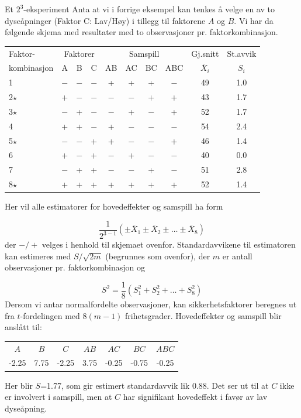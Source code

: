 \begin{eksempel}{Et $2^3$-eksperiment}
Anta at vi i forrige eksempel kan tenkes å velge en av to 
dyseåpninger (Faktor C: Lav/Høy) i tillegg til faktorene $A$ og $B$.
Vi har da følgende skjema med resultater med to observasjoner pr.
faktorkombinasjon.
\begin{center} \addtolength{\tabcolsep}{-0.1\tabcolsep} 
\begin{tabular}{|l|ccc|ccc|c|cc|} \hline
Faktor-     & \multicolumn{3}{c|}{Faktorer}& \multicolumn{4}{c|}{Samspill} &
                                              Gj.snitt &  St.avvik   \\
kombinasjon &  A & B & C  &  AB & AC & BC &  ABC &$\bar{X}_i$& $S_i$\\ \hline
  1         & $-$&$-$&$-$ &  +  & +  & +  &  $-$ &    49     &  1.0    \\  
  2$\star$  &  + &$-$&$-$ & $-$ &$-$ & +  &   +  &    43     &  1.7  \\
  3$\star$  & $-$& + &$-$ & $-$ & +  &$-$ &   +  &    52     &  1.7  \\
  4         &  + & + &$-$ &  +  &$-$ &$-$ &  $-$ &    54     &  2.4 \\
  5$\star$  & $-$&$-$& +  &  +  &$-$ &$-$ &   +  &    46     &  1.4 \\
  6         &  + &$-$& +  & $-$ & +  &$-$ &  $-$ &    40     &  0.0  \\
  7         & $-$& + & +  & $-$ &$-$ & +  &  $-$ &    51     &  2.8 \\
  8$\star$  &  + & + & +  &  +  & +  & +  &   +  &    52     &  1.4 \\ \hline
\end{tabular}
\end{center}
Her vil alle estimatorer for hovedeffekter og samspill ha form

\[ \frac{1}{2^{3-1}}(\pm \bar{X}_1\pm \bar{X}_2\pm \ldots \pm \bar{X}_8) \]
der $-/+$ velges i henhold til skjemaet ovenfor.  Standardavvikene til
estimatoren kan estimeres med $S/\sqrt{2m}$ (begrunnes som ovenfor),
der $m$ er antall observasjoner pr. faktorkombinasjon og 

\[       S^2=\frac{1}{8}(S_1^2+S_2^2+ \ldots +S_8^2) \]
Dersom vi antar normalfordelte observasjoner, kan sikkerhetsfaktorer 
beregnes ut fra $t$-fordelingen med $8(m-1)$ frihetsgrader. 
Hovedeffekter og samspill blir anslått til:
\begin{center}
\begin{tabular}{ccccccc}
 $A$ & $B$ & $C$ & $AB$ & $AC$ & $BC$ & $ABC$ \\
 -2.25& 7.75&-2.25& 3.75 &-0.25 &-0.75 &-0.25
\end{tabular}
\end{center}
Her blir $S$=1.77, som gir estimert standardavvik lik 0.88.
Det ser ut til at $C$ ikke er involvert i samspill, men at $C$ har signifikant
 hovedeffekt i favør av lav dyseåpning.
\end{eksempel}

